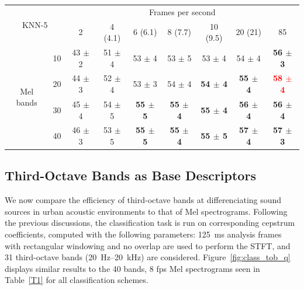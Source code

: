 \documentclass[sensors,article,accept,moreauthors,pdftex,10pt,a4paper]{mdpi}
\begin{document}
\begin{table}[H]
\begin{tabular}{ccccccccc}
\multicolumn{2}{c}{\multirow{2}{*}{KNN-5}} & \multicolumn{7}{c}{Frames per second}\\ 
\cmidrule{2-9}
 & & 2 & 4 (4.1) & 6 (6.1) & 8 (7.7) & 10 (9.5) & 20 (21) & 85 \\ 

\midrule

\multicolumn{1}{c}{\multirow{4}{*}{Mel bands}}
 & \multicolumn{1}{c}{10} &43 $\pm$ 2 & 51 $\pm$ 4 & 53 $\pm$ 4 & 53 $\pm$ 5 & 53 $\pm$ 4 & 54 $\pm$ 4 & \textbf{56 $\pm$ 3} \\ 
\multicolumn{1}{c}{}
 & \multicolumn{1}{c}{20} & 44 $\pm$ 3 & 52 $\pm$ 4 & 53 $\pm$ 3 & 54 $\pm$ 4 & \textbf{54 $\pm$ 4} & \textbf{55 $\pm$ 4} & \textbf{\textcolor{red}{58 $\pm$ 4}} \\ 
\multicolumn{1}{c}{}
 & \multicolumn{1}{c}{30} & 45 $\pm$ 4 & 54 $\pm$ 5 & \textbf{55 $\pm$ 5} & \textbf{55 $\pm$ 4} & \textbf{55 $\pm$ 4} & \textbf{56 $\pm$ 4} & \textbf{56 $\pm$ 4} \\ 
\multicolumn{1}{c}{}
 & \multicolumn{1}{c}{40} & 46 $\pm$ 3 & 53 $\pm$ 5 & \textbf{55 $\pm$ 5} & \textbf{55 $\pm$ 4} & \textbf{55 $\pm$ 5} & \textbf{57 $\pm$ 4} & \textbf{57 $\pm$ 3} \\ 
 \bottomrule
\end{tabular}

\end{table}



\subsection{Third-Octave Bands as Base Descriptors} \label{sec:tob_r}

We now compare the efficiency of third-octave bands at differenciating sound sources in urban acoustic environments to that of Mel spectrograms. Following the previous discussions, the classification task is run on corresponding cepstrum coefficients, computed with the following parameters: 125~ms analysis frames with rectangular windowing and no overlap are used to perform the STFT, and 31 third-octave bands (20~Hz--20~kHz) are considered. Figure~\ref{fig:class_tob_q} displays similar results to the 40 bands, 8 fps Mel spectrograms seen in Table~\ref{T1} for all classification schemes.
\end{document}

